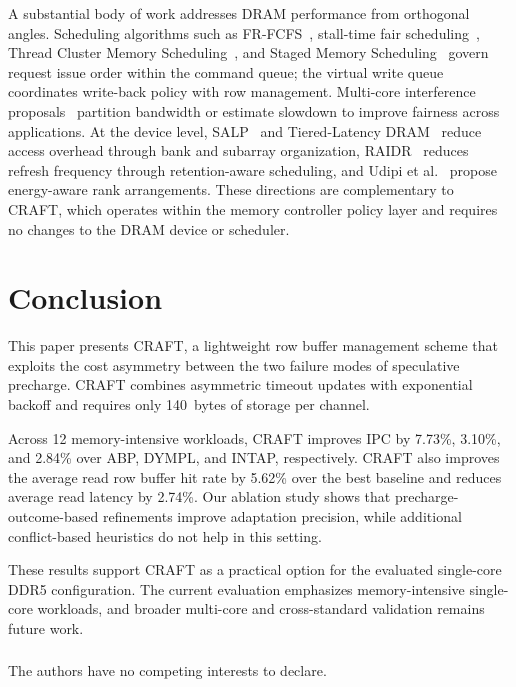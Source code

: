 \documentclass[runningheads]{llncs}
\begin{document}
A substantial body of work addresses DRAM performance from orthogonal angles. Scheduling algorithms such as FR-FCFS~\cite{Rixner00}, stall-time fair scheduling~\cite{Mutlu07}, Thread Cluster Memory Scheduling~\cite{Kim10}, and Staged Memory Scheduling~\cite{Ausavarungnirun12} govern request issue order within the command queue; the virtual write queue~\cite{Stuecheli10} coordinates write-back policy with row management. Multi-core interference proposals~\cite{Muralidhara11,Subramanian13} partition bandwidth or estimate slowdown to improve fairness across applications. At the device level, SALP~\cite{Kim12} and Tiered-Latency DRAM~\cite{Lee13} reduce access overhead through bank and subarray organization, RAIDR~\cite{Liu12} reduces refresh frequency through retention-aware scheduling, and Udipi et al.~\cite{Udipi10} propose energy-aware rank arrangements. These directions are complementary to CRAFT, which operates within the memory controller policy layer and requires no changes to the DRAM device or scheduler.

\section{Conclusion}
\label{sec:conclusion}

This paper presents CRAFT, a lightweight row buffer management scheme that exploits the cost asymmetry between the two failure modes of speculative precharge. CRAFT combines asymmetric timeout updates with exponential backoff and requires only 140~bytes of storage per channel.

Across 12 memory-intensive workloads, CRAFT improves IPC by 7.73\%, 3.10\%, and 2.84\% over ABP, DYMPL, and INTAP, respectively. CRAFT also improves the average read row buffer hit rate by 5.62\% over the best baseline and reduces average read latency by 2.74\%. Our ablation study shows that precharge-outcome-based refinements improve adaptation precision, while additional conflict-based heuristics do not help in this setting.

These results support CRAFT as a practical option for the evaluated single-core DDR5 configuration. The current evaluation emphasizes memory-intensive single-core workloads, and broader multi-core and cross-standard validation remains future work.

\begin{credits}
\subsubsection{\discintname} The authors have no competing interests to declare.
\end{credits}


\end{document}
